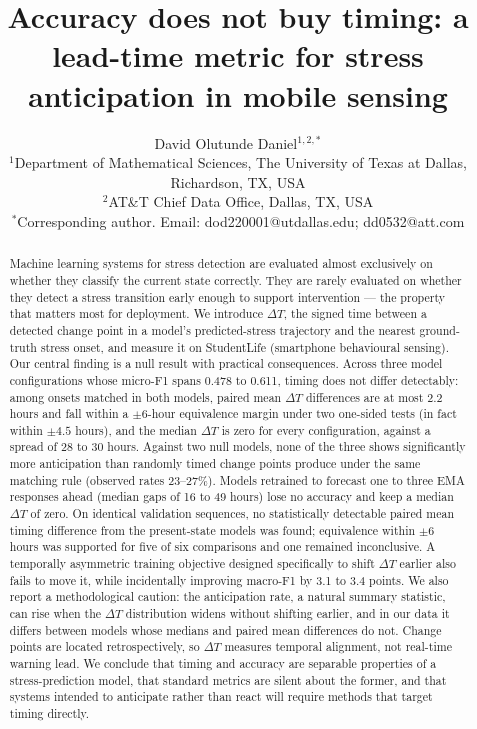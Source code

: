 \documentclass[preprint,12pt,authoryear]{elsarticle}
\newcommand{\dt}{$\Delta T$}
\begin{document}
\begin{frontmatter}

\title{Accuracy does not buy timing: a lead-time metric for stress
anticipation in mobile sensing}

\author{David Olutunde Daniel$^{1,2,*}$\\[6pt]
\normalfont
$^1$Department of Mathematical Sciences, The University of Texas at Dallas, Richardson, TX, USA\\
$^2$AT\&T Chief Data Office, Dallas, TX, USA\\
$^*$Corresponding author. Email: dod220001@utdallas.edu; dd0532@att.com}

\begin{abstract}
Machine learning systems for stress detection are evaluated almost
exclusively on whether they classify the current state correctly. They
are rarely evaluated on whether they detect a stress transition early
enough to support intervention --- the property that matters most for
deployment. We introduce \dt{}, the signed time between a detected
change point in a model's predicted-stress trajectory and the nearest
ground-truth stress onset, and measure it on StudentLife (smartphone
behavioural sensing). Our central finding is a null result with
practical consequences. Across three model configurations whose
micro-F1 spans 0.478 to 0.611, timing does not differ detectably: among
onsets matched in both models, paired mean \dt{} differences are at
most 2.2 hours and fall within a $\pm 6$-hour equivalence margin under
two one-sided tests (in fact within $\pm 4.5$ hours), and the median
\dt{} is zero for every configuration, against a spread of 28 to 30
hours. Against two null models, none of the three shows significantly
more anticipation than randomly timed change points produce under the
same matching rule (observed rates 23--27\%).
Models retrained to forecast one to three EMA responses ahead (median
gaps of 16 to 49 hours) lose no accuracy and keep a median \dt{} of
zero. On identical validation sequences, no statistically detectable
paired mean timing difference from the present-state models was found;
equivalence within $\pm 6$ hours was supported for five of six
comparisons and one remained inconclusive. A
temporally asymmetric training objective designed specifically to shift
\dt{} earlier also fails to move it, while incidentally improving
macro-F1 by 3.1 to 3.4 points.
We also report a methodological caution: the anticipation rate, a
natural summary statistic, can rise when the \dt{} distribution widens
without shifting earlier, and in our data it differs between models
whose medians and paired mean differences do not. Change points are
located retrospectively, so \dt{} measures temporal alignment, not
real-time warning lead. We conclude
that timing and accuracy are separable properties of a stress-prediction
model, that standard metrics are silent about the former, and that
systems intended to anticipate rather than react will require methods
that target timing directly.
\end{abstract}


\end{frontmatter}
\end{document}
